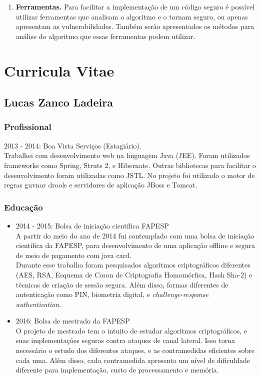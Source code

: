 \documentclass[12pt]{article}
\begin{document}
\begin{enumerate}
\item \textbf{Ferramentas.} Para facilitar a implementa\c{c}\~ao de um c\'odigo seguro \'e poss\'ivel utilizar ferramentas que analisam o algoritmo e o tornam seguro, ou apenas apresentam as vulnerabilidades. Tamb\'em ser\~ao apresentados os m\'etodos para an\'alise do algoritmo que essas ferramentas podem utilizar.

\end{enumerate}




\pagebreak 

\section{Curricula Vitae}
\subsection{Lucas Zanco Ladeira}
\subsubsection{Profissional}
2013 - 2014: Boa Vista Servi\c{c}os (Estagi\'ario).\\
Trabalhei com desenvolvimento web na linguagem Java (JEE). Foram utilizados frameworks como Spring, Struts 2, e Hibernate. Outras bibliotecas para facilitar o desenvolvimento foram utilizadas como JSTL. No projeto foi utilizado o motor de regras guvnor drools e servidores de aplica\c{c}\~ao JBoss e Tomcat.

\subsubsection{Educa\c{c}\~ao}
\begin{itemize}
\item 2014 - 2015: Bolsa de inicia\c{c}\~ao cient\'ifica FAPESP\\
A partir do meio do ano de 2014 fui contemplado com uma bolsa de inicia\c{c}\~ao cient\'ifica da FAPESP, para desenvolvimento de uma aplica\c{c}\~ao offline e segura de meio de pagamento com java card.\\
Durante esse trabalho foram pesquisados algoritmos criptogr\'aficos diferentes (AES, RSA, Esquema de Coron de Criptografia Homom\'orfica, Hash Sha-2) e t\'ecnicas de cria\c{c}\~ao de sess\~ao segura. Al\'em disso, formas diferentes de autentica\c{c}\~ao como PIN, biometria digital, e \textit{challenge-response authentication}.

\item 2016: Bolsa de mestrado da FAPESP\\
O projeto de mestrado tem o intuito de estudar algoritmos criptogr\'aficos, e suas implementa\c{c}\~oes seguras contra ataques de canal lateral. Isso torna necess\'ario o estudo dos diferentes ataques, e as contramedidas eficientes sobre cada uma. Al\'em disso, cada contramedida apresenta um n\'ivel de dificuldade diferente para implementa\c{c}\~ao, custo de processamento e mem\'oria.

\end{itemize}
\end{document}
